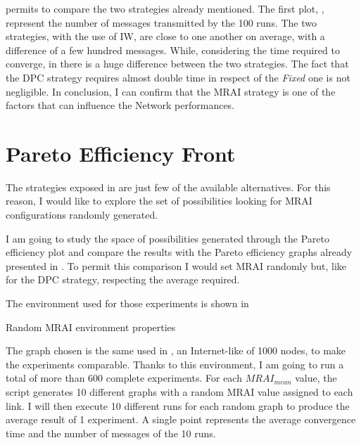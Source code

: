  permits to compare the two strategies already
mentioned.
The first plot, , represent
the number of messages transmitted by the \num{100} runs.
The two strategies, with the use of \ac{IW}, are close to one another on average,
with a difference of a few hundred messages.
While, considering the time required to converge, in 
there is a huge difference between the two strategies.
The fact that the \ac{DPC} strategy requires almost double time in respect of the
\textit{Fixed} one is not negligible.
In conclusion, I can confirm that the \ac{MRAI} strategy is one of the factors that
can influence the Network performances.

\section{Pareto Efficiency Front}
\label{sec:bgp_mrai_pareto_front}

The strategies exposed in  are just few
of the available alternatives.
For this reason, I would like to explore the set of possibilities looking
for \ac{MRAI} configurations randomly generated.

I am going to study the space of possibilities generated through the
Pareto efficiency plot and compare the results with the Pareto efficiency
graphs already presented in .
To permit this comparison I would set \ac{MRAI} randomly but, like for
the \ac{DPC} strategy, respecting the average required.

The environment used for those experiments is shown in 

\begin{table}[h]
	
	\caption{Random \ac{MRAI} environment properties}
	\label{tbl:random_env}
\end{table}

The graph chosen is the same used in ,
an Internet-like of \num{1000} nodes, to make the experiments comparable.
Thanks to this environment, I am going to run a total of more than \num{600} complete
experiments.
For each \(MRAI_{mean}\) value, the script generates \num{10} different graphs with a random
\ac{MRAI} value assigned to each link.
I will then execute \num{10} different runs for each random graph to produce
the average result of \num{1} experiment.
A single point represents the average convergence time and the number of messages
of the \num{10} runs.

